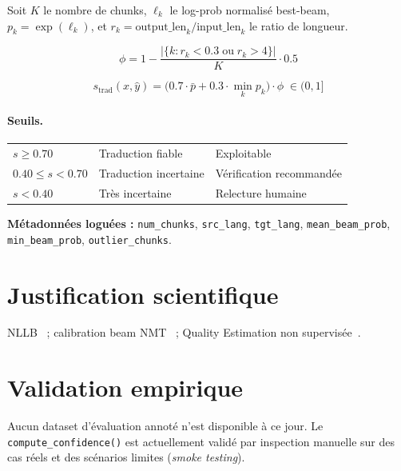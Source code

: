 \medskip
Soit $K$ le nombre de chunks, $\ell_k$ le log-prob normalisé best-beam,
$p_k = \exp(\ell_k)$, et $r_k = \text{output\_len}_k / \text{input\_len}_k$
le ratio de longueur.

\begin{equation}
  \phi = 1 - \frac{|\{k : r_k < 0.3 \;\text{ou}\; r_k > 4\}|}{K} \cdot 0.5
  \label{eq:trad_penalty}
\end{equation}

\begin{equation}
  s_{\text{trad}}(x, \hat{y})
  = \bigl(0.7 \cdot \bar{p} + 0.3 \cdot \min_k p_k\bigr) \cdot \phi
  \;\in (0, 1]
  \label{eq:trad}
\end{equation}

\paragraph{Seuils.}

\begin{center}
\begin{tabular}{lll}
\toprule
$s \geq 0.70$ & Traduction fiable & Exploitable \\
$0.40 \leq s < 0.70$ & Traduction incertaine & Vérification recommandée \\
$s < 0.40$ & Très incertaine & Relecture humaine \\
\bottomrule
\end{tabular}
\end{center}

\textbf{Métadonnées loguées :} \texttt{num\_chunks}, \texttt{src\_lang},
\texttt{tgt\_lang}, \texttt{mean\_beam\_prob}, \texttt{min\_beam\_prob},
\texttt{outlier\_chunks}.

\section{Justification scientifique}

NLLB~\cite{nllb2022} ; calibration beam NMT~\cite{ott2018analyzing} ;
Quality Estimation non supervisée~\cite{fomicheva2020unsupervised}.

\section{Validation empirique}

Aucun dataset d'évaluation annoté n'est disponible à ce jour. Le
\texttt{compute\_confidence()} est actuellement validé par inspection manuelle
sur des cas réels et des scénarios limites (\textit{smoke testing}).

